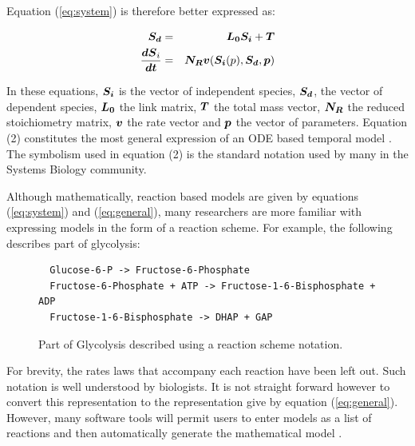 \documentclass[12pt]{article}
\newcommand{\bT}{\mbox{\boldmath $T$}}
\newcommand{\bLo}{\mbox{\boldmath $L_0$}}
\newcommand{\bNr}{\mbox{\boldmath $N_R$}}
\newcommand{\bSi}{\mbox{\boldmath $S_i$}}
\newcommand{\bSd}{\mbox{\boldmath $S_d$}}
\newcommand{\bdS}{\mbox{\boldmath $dS$}}
\newcommand{\bdt}{\mbox{\boldmath $dt$}}
\newcommand{\bdSidt}{\mbox{$\displaystyle \frac{\bdS_i}{\bdt}$}}
\newcommand{\bv}{\mbox{\boldmath $v$}}
\newcommand{\bp}{\mbox{\boldmath $p$}}
\begin{document}
Equation (\ref{eq:system}) is therefore better expressed as:

{ \addtolength{\jot}{6pt}
\begin{eqnarray}
  \bSd &=& \bLo \bSi + \bT \nonumber \\
  \bdSidt &=& \bNr \bv (\bSi (p), \bSd, \bp) \label{eq:general}
\end{eqnarray} }

In these equations, $\bSi$ is the vector of independent species,
$\bSd$, the vector of dependent species, $\bLo$ the link matrix,
$\bT$ the total mass vector, $\bNr$ the reduced stoichiometry
matrix, $\bv$ the rate vector and $\bp$ the vector of parameters. Equation (2)
constitutes the most general expression of an ODE based temporal model \cite{hofmeyr-nutshell,Schuster:Book}. The symbolism used in equation (2) is the standard
notation used by many in the Systems Biology community. 

Although mathematically, reaction based models are given by
equations (\ref{eq:system}) and (\ref{eq:general}), many researchers
are more familiar with expressing models in the form of a reaction scheme. For example, 
the following describes part of glycolysis:

\begin{figure}[h]  \label{figure:script}
{\small
\begin{verbatim}
  Glucose-6-P -> Fructose-6-Phosphate
  Fructose-6-Phosphate + ATP -> Fructose-1-6-Bisphosphate + ADP
  Fructose-1-6-Bisphosphate -> DHAP + GAP
\end{verbatim} }
\caption {Part of Glycolysis described using a reaction scheme notation.} 
\end{figure}


For brevity, the rates laws that accompany each
reaction have been left out. Such notation is well understood by biologists.
It is not straight forward however  to convert this representation to the
representation give by equation (\ref{eq:general}). However, many software
tools will permit users to enter models as a list of reactions and
then automatically generate the mathematical model
\cite{SauroF91,sauro:2000,Sauro:Omics}.

\medskip
\end{document}
